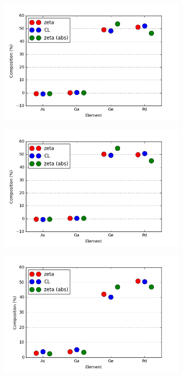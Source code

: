 \begin{figure}
	\centering
	\begin{subfigure}{0.45\textwidth}
		\includegraphics[width=\textwidth]{fig/q/B-C-F/B2}
		\caption{}
		\label{fig:BCF-plots-B}
	\end{subfigure}
	\hfill
	\begin{subfigure}{0.45\textwidth}
		\includegraphics[width=\textwidth]{fig/q/B-C-F/C2}
		\caption{}
		\label{fig:BCF-plots-C}
	\end{subfigure}
	\begin{subfigure}{0.45\textwidth}
	\includegraphics[width=\textwidth]{fig/q/B-C-F/F2}

\end{subfigure}
\end{figure}
